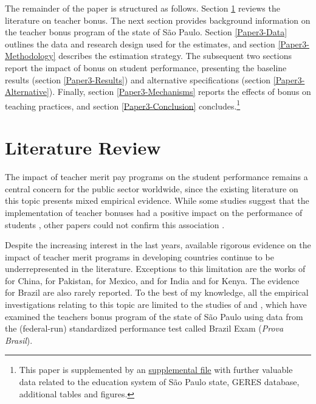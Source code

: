 \documentclass[a4paper, 12pt]{article}
\begin{document}
The remainder of the paper is structured as follows. Section \ref{Paper3-Literature} reviews the literature on teacher bonus. The next section provides background information on the teacher bonus program of the state of São Paulo. Section \ref{Paper3-Data} outlines the data and research design used for the estimates, and section \ref{Paper3-Methodology} describes the estimation strategy. The subsequent two sections report the impact of bonus on student performance, presenting the baseline results (section \ref{Paper3-Results}) and alternative specifications (section \ref{Paper3-Alternative}). Finally, section \ref{Paper3-Mechanisms} reports the effects of bonus on teaching practices, and section \ref{Paper3-Conclusion} concludes.\footnote{This paper is supplemented by an \hyperref[SuppMaterial]{supplemental file} with further valuable data related to the education system of São Paulo state, GERES database, additional tables and figures.}




\section{Literature Review} \label{Paper3-Literature}





The impact of teacher merit pay programs on the student performance remains a central concern for the public sector worldwide, since the existing literature on this topic presents mixed empirical evidence. While some studies suggest that the implementation of teacher bonuses had a positive impact on the performance of students \citep[see e.g.][]{loyalka2019pay, britton2016teacher, dee2015incentives, imberman2015incentive, duflo2012incentives, lavy2009performance, muralidharan2011teacher}, other papers could not confirm this association \citep[see e.g.][]{barrera2017teacher, behrman2015aligning, yuan2013incentive, springer2012team, glewwe2010teacher}.


Despite the increasing interest in the last years, available rigorous evidence on the impact of teacher merit programs in developing countries continue to be underrepresented in the literature. Exceptions to this limitation are the works of \citet{loyalka2019pay} for China, \citet{barrera2017teacher} for Pakistan, \citet{behrman2015aligning} for Mexico, \citet{duflo2012incentives} and \citet{muralidharan2011teacher} for India and \citet{glewwe2010teacher} for Kenya. The evidence for Brazil are also rarely reported. To the best of my knowledge, all the empirical investigations relating to this topic are limited to the studies of \citet{lepine2016teacher} and \citet{oshiro2015impacto}, which have examined the teachers bonus program of the state of São Paulo using data from the (federal-run) standardized performance test called Brazil Exam (\textit{Prova Brasil}). 
\end{document}
